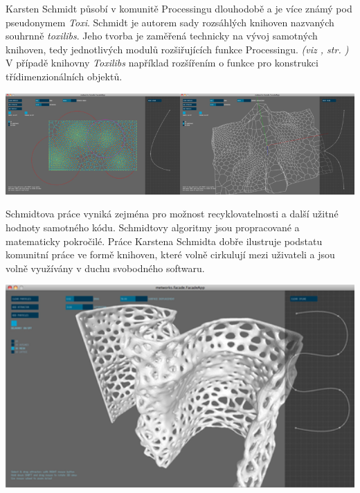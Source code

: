 \documentclass[10pt]{book}
\newcommand{\odkaz}[1]{\textit{(viz \nameref{#1}, str. \pageref*{#1})}}
\begin{document}
Karsten Schmidt působí v komunitě Processingu dlouhodobě a je více známý pod pseudonymem {\em Toxi}. Schmidt je autorem sady rozsáhlých knihoven nazvaných souhrnně {\em toxilibs}. Jeho tvorba je zaměřená technicky na vývoj samotných knihoven, tedy jednotlivých modulů rozšiřujících funkce Processingu. \odkaz{Knihovny} V případě knihovny {\em Toxilibs} například rozšířením o funkce pro konstrukci třídimenzionálních objektů. 


\begin{center}
\includegraphics[width = 0.5\textwidth]{imgs/facade-3.png}\includegraphics[width = 0.5\textwidth]{imgs/facade-5.png}

\end{center}

Schmidtova práce vyniká zejména pro možnost recyklovatelnosti a další užitné hodnoty samotného kódu. Schmidtovy algoritmy jsou propracované a matematicky pokročilé. Práce Karstena Schmidta dobře ilustruje podstatu komunitní práce ve formě knihoven, které volně cirkulují mezi uživateli a jsou volně využívány v duchu svobodného softwaru. 






\begin{center}
\includegraphics[width = 1\textwidth]{imgs/facade-7.png}
\end{center}
\end{document}
